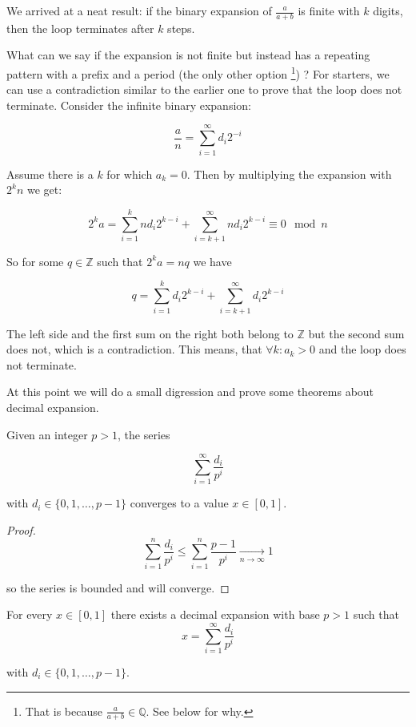 We arrived at a neat result: if the binary expansion of $\frac{a}{a+b}$ is finite with $k$ digits, then the loop terminates after $k$ steps.

What can we say if the expansion is not finite but instead has a repeating pattern with a prefix and a period (the only other option \footnote{That is because $\frac{a}{a+b} \in \mathbb{Q}$. See below for why.}) ? For starters, we can use a contradiction similar to the earlier one to prove that the loop does not terminate. Consider the infinite binary expansion:

$$
  \frac{a}{n} = \sum_{i = 1}^\infty d_i 2^{-i}
$$

Assume there is a $k$ for which $a_k = 0$. Then by multiplying the expansion with $2^k n$ we get:

$$
  2^k a = \sum_{i = 1}^k n d_i 2^{k-i} + \sum_{i = k+1}^\infty n d_i 2^{k-i} \equiv 0 \mod n
$$

So for some $q \in \mathbb{Z}$ such that $2^k a = n q$ we have

$$
  q = \sum_{i = 1}^k d_i 2^{k-i} + \sum_{i = k+1}^\infty d_i 2^{k-i}
$$

The left side and the first sum on the right both belong to $\mathbb{Z}$ but the second sum does not, which is a contradiction. This means, that $\forall k: a_k > 0$ and the loop does not terminate.

At this point we will do a small digression and prove some theorems about decimal expansion. 

\begin{thm}\label{while_a_decimal_expansion_one}
Given an integer $p > 1$, the series

$$
\sum_{i=1}^\infty \frac{d_i}{p^i}
$$

with $d_i \in \{0, 1, \ldots, p-1\}$ converges to a value $x \in [0, 1]$.
\end{thm}

\begin{proof}

$$
\sum_{i=1}^n \frac{d_i}{p^i} \leq \sum_{i=1}^n \frac{p-1}{p^i} \xrightarrow[n \to \infty]{} 1
$$

so the series is bounded and will converge.
\end{proof}

\begin{thm}\label{while_a_decimal_expansion_one}
For every $x \in [0, 1]$ there exists a decimal expansion with base $p > 1$ such that
$$
x = \sum_{i=1}^\infty \frac{d_i}{p^i}
$$

with $d_i \in \{0, 1, \ldots, p-1\}$.
\end{thm}

